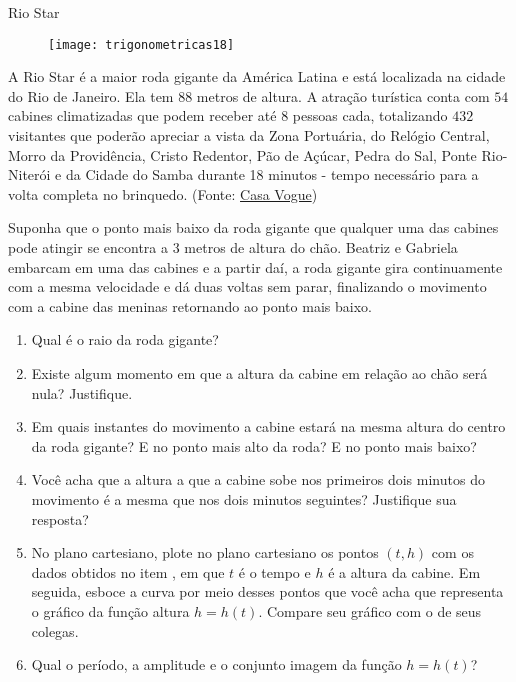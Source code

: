 \begin{task}{Rio Star}
\label{trig-ativ4}

\begin{figure}[H]
\centering

\texttt{[image: trigonometricas18]}
\end{figure}

A Rio Star é a maior roda gigante da América Latina e está localizada na cidade do Rio de Janeiro. Ela tem $88$ metros de altura. A atração turística conta com $54$ cabines climatizadas que podem receber até 8 pessoas cada, totalizando $432$ visitantes que poderão apreciar a vista da Zona Portuária, do Relógio Central, Morro da Providência, Cristo Redentor, Pão de Açúcar, Pedra do Sal, Ponte Rio-Niterói e da Cidade do Samba durante 18 minutos - tempo necessário para a volta completa no brinquedo. (Fonte: \href{https://casavogue.globo.com/LazerCultura/Viagem/noticia/2019/12/rio-star-roda-gigante-do-rio-de-janeiro-inaugura-hoje.html}{Casa Vogue})

Suponha que o ponto mais baixo da roda gigante que qualquer uma das cabines pode atingir se encontra a $3$ metros de altura do chão. Beatriz e Gabriela embarcam em uma das cabines e a partir daí, a roda gigante gira continuamente com a mesma velocidade e dá duas voltas sem parar, finalizando o movimento com a cabine das meninas retornando ao ponto mais baixo.

\begin{enumerate}
\item Qual é o raio da roda gigante?
\item Existe algum momento em que a altura da cabine em relação ao chão será nula? Justifique.
\item Em quais instantes do movimento a cabine estará na mesma altura do centro da roda gigante? E no ponto mais alto da roda? E no ponto mais baixo?
\item Você acha que a altura a que a cabine sobe nos primeiros dois minutos do movimento é a mesma que nos dois minutos seguintes? Justifique sua resposta?
\item No plano cartesiano, plote no plano cartesiano os pontos $(t,h)$ com os dados obtidos no item , em que $t$ é o tempo e $h$ é a altura da cabine. Em seguida, esboce a curva por meio desses pontos que você acha que representa o gráfico da função altura $h = h(t)$. Compare seu gráfico com o de seus colegas.
\item Qual o período, a amplitude e o conjunto imagem da função $h = h(t)$?
\end{enumerate}
\end{task}

